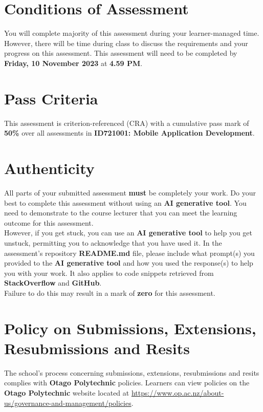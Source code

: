 \documentclass{article}
\begin{document}
\section*{Conditions of Assessment}
You will complete majority of this assessment during your learner-managed time. However, there will be time during class to discuss the requirements and your progress on this assessment. This assessment will need to be completed by \textbf{Friday, 10 November 2023} at \textbf{4.59 PM}.

\section*{Pass Criteria}
This assessment is criterion-referenced (CRA) with a cumulative pass mark of \textbf{50\%} over all assessments in \textbf{ID721001: Mobile Application Development}.

\section*{Authenticity}
All parts of your submitted assessment \textbf{must} be completely your work. Do your best to complete this assessment without using an \textbf{AI generative tool}. You need to demonstrate to the course lecturer that you can meet the learning outcome for this assessment. \\
 
 However, if you get stuck, you can use an \textbf{AI generative tool} to help you get unstuck, permitting you to acknowledge that you have used it. In the assessment's repository \textbf{README.md} file, please include what prompt(s) you provided to the \textbf{AI generative tool} and how you used the response(s) to help you with your work. It also applies to code snippets retrieved from \textbf{StackOverflow} and \textbf{GitHub}. \\
 
 Failure to do this may result in a mark of \textbf{zero} for this assessment.

\section*{Policy on Submissions, Extensions, Resubmissions and Resits}
The school's process concerning submissions, extensions, resubmissions and resits complies with \textbf{Otago Polytechnic} policies. Learners can view policies on the \textbf{Otago Polytechnic} website located at \href{https://www.op.ac.nz/about-us/governance-and-management/policies}{https://www.op.ac.nz/about-us/governance-and-management/policies}.
\end{document}

